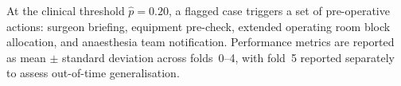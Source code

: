 At the clinical threshold $\hat{p} = 0.20$, a flagged case triggers a set of
pre-operative actions: surgeon briefing, equipment pre-check, extended operating
room block allocation, and anaesthesia team notification.  Performance metrics
are reported as mean $\pm$ standard deviation across folds~0--4, with fold~5
reported separately to assess out-of-time generalisation.
